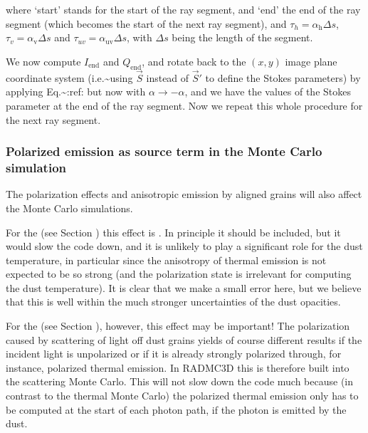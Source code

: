 \documentclass[letterpaper,10pt,english]{sphinxmanual}
\begin{document}
where ‘start’ stands for the start of the ray segment, and ‘end’ the end of the
ray segment (which becomes the start of the next ray segment), and
\(\tau_h=\alpha_{\mathrm{h}}\Delta s\),
\(\tau_v=\alpha_{\mathrm{v}}\Delta s\) and
\(\tau_{uv}=\alpha_{\mathrm{uv}}\Delta s\), with \(\Delta s\) being the
length of the segment.

We now compute \(I_{\mathrm{end}}\) and \(Q_{\mathrm{end}}\), and rotate
back to the \((x,y)\) image plane coordinate system (i.e.\textasciitilde{}using \(\vec
S\) instead of \(\vec S'\) to define the Stokes parameters) by applying
Eq.\textasciitilde{}:ref: but now with \(\alpha\rightarrow -\alpha\),
and we have the values of the Stokes parameter at the end of the ray
segment. Now we repeat this whole procedure for the next ray segment.


\subsubsection{Polarized emission as source term in the Monte Carlo simulation}
\label{\detokenize{dustradtrans:polarized-emission-as-source-term-in-the-monte-carlo-simulation}}
The polarization effects and anisotropic emission by aligned grains will
also affect the Monte Carlo simulations.

For the  (see Section {\hyperref[\detokenize{dustradtrans:sec-dust-thermal-monte-carlo}]{}})
this effect is . In principle it should be included, but it would
slow the code down, and it is unlikely to play a significant role for the dust
temperature, in particular since the anisotropy of thermal emission is not
expected to be so strong (and the polarization state is irrelevant for computing
the dust temperature). It is clear that we make a small error here, but we
believe that this is well within the much stronger uncertainties of the dust
opacities.

For the  (see Section {\hyperref[\detokenize{dustradtrans:sec-scat-monte-carlo}]{}}),
however, this effect may be important! The polarization caused by scattering of
light off dust grains yields of course different results if the incident light
is unpolarized or if it is already strongly polarized through, for instance,
polarized thermal emission. In RADMC\sphinxhyphen{}3D this is therefore built into the
scattering Monte Carlo. This will not slow down the code much because (in
contrast to the thermal Monte Carlo) the polarized thermal emission only has to
be computed at the start of each photon path, if the photon is emitted by the
dust.
\end{document}
